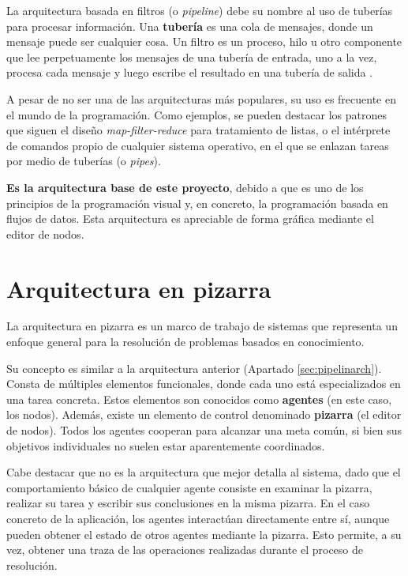 La arquitectura basada en filtros (o \textit{pipeline}) debe su nombre al uso de tuberías para procesar información. Una \textbf{tubería} es una cola de mensajes, donde un mensaje puede ser cualquier cosa. Un filtro es un proceso, hilo u otro componente que lee perpetuamente los mensajes de una tubería de entrada, uno a la vez, procesa cada mensaje y luego escribe el resultado en una tubería de salida \cite{pipelineArch}.\sn

A pesar de no ser una de las arquitecturas más populares, su uso es frecuente en el mundo de la programación. Como ejemplos, se pueden destacar los patrones que siguen el diseño \textit{map-filter-reduce} para tratamiento de listas, o el intérprete de comandos propio de cualquier sistema operativo, en el que se enlazan tareas por medio de tuberías (o \textit{pipes}).\sn

\textbf{Es la arquitectura base de este proyecto}, debido a que es uno de los principios de la programación visual y, en concreto, la programación basada en flujos de datos. Esta arquitectura es apreciable de forma gráfica mediante el editor de nodos.


\section{Arquitectura en pizarra} \label{sec:boardarch}

La arquitectura en pizarra \cite{wikiBlackboard} es un marco de trabajo de sistemas que representa un enfoque general para la resolución de problemas basados en conocimiento.\sn

Su concepto es similar a la arquitectura anterior (Apartado \ref{sec:pipelinarch}). Consta de múltiples elementos funcionales, donde cada uno está especializados en una tarea concreta. Estos elementos son conocidos como \textbf{agentes} (en este caso, los nodos). Además, existe un elemento de control denominado \textbf{pizarra} (el editor de nodos). Todos los agentes cooperan para alcanzar una meta común, si bien sus objetivos individuales no suelen estar aparentemente coordinados.\sn

Cabe destacar que no es la arquitectura que mejor detalla al sistema, dado que el comportamiento básico de cualquier agente consiste en examinar la pizarra, realizar su tarea y escribir sus conclusiones en la misma pizarra. En el caso concreto de la aplicación, los agentes interactúan directamente entre sí, aunque pueden obtener el estado de otros agentes mediante la pizarra. Esto permite, a su vez, obtener una traza de las operaciones realizadas durante el proceso de resolución.\sn

